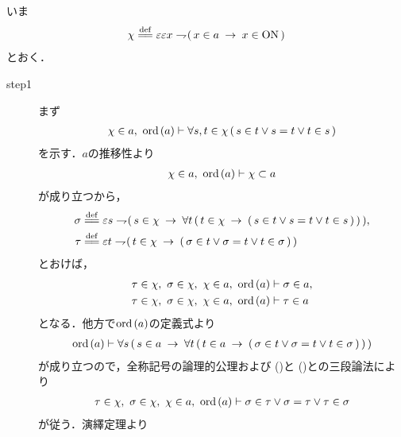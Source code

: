 	\begin{sketch}
		いま
		\begin{align}
			\chi \defeq \varepsilon \varepsilon x \negation 
			(\, x \in a \rarrow x \in \ON\, )
		\end{align}
		とおく．
		\begin{description}
			\item[step1] まず
				\begin{align}
					\chi \in a,\ \operatorname*{ord}\hspace{0.15em}(a) \vdash 
					\forall s,t \in \chi\, (\, s \in t \vee s = t \vee t \in s\, )
					\label{fom:thm_transitive_totally_ordered_class_1}
				\end{align}
				を示す．$a$の推移性より
				\begin{align}
					\chi \in a,\ \operatorname*{ord}\hspace{0.15em}(a) \vdash \chi \subset a
				\end{align}
				が成り立つから，
				\begin{align}
					\sigma &\defeq \varepsilon s \negation 
					(\, s \in \chi \rarrow \forall t\, (\, t \in \chi \rarrow 
					(\, s \in t \vee s = t \vee t \in s\, )\, )\, ), \\
					\tau &\defeq \varepsilon t \negation (\, t \in \chi \rarrow 
					(\, \sigma \in t \vee \sigma = t \vee t \in \sigma\, )\, )
				\end{align}
				とおけば，
				\begin{align}
					\tau \in \chi,\ \sigma \in \chi,\ \chi \in a,\ \ord{a} 
					&\vdash \sigma \in a, 
					\label{fom:thm_transitive_totally_ordered_class_2} \\
					\tau \in \chi,\ \sigma \in \chi,\ \chi \in a,\ \ord{a} 
					&\vdash \tau \in a
					\label{fom:thm_transitive_totally_ordered_class_3}
				\end{align}
				となる．他方で$\operatorname*{ord}\hspace{0.15em}(a)$の定義式より
				\begin{align}
					\operatorname*{ord}\hspace{0.15em}(a) \vdash 
					\forall s\, (\, s \in a \hspace{0.25em}\rightarrow\hspace{0.25em} 
					\forall t\, (\, t \in a \hspace{0.25em}\rightarrow\hspace{0.25em} (\, \sigma \in t \vee \sigma = t \vee t \in \sigma\, )\, )\, )
					\label{fom:thm_transitive_totally_ordered_class_4}
				\end{align}
				が成り立つので，全称記号の論理的公理および
				()と
				()との三段論法により
				\begin{align}
					\tau \in \chi,\ \sigma \in \chi,\ \chi \in a,\ \ord{a} \vdash 
					\sigma \in \tau \vee \sigma = \tau \vee \tau \in \sigma
				\end{align}
				が従う．演繹定理より

\end{description}
\end{sketch}
